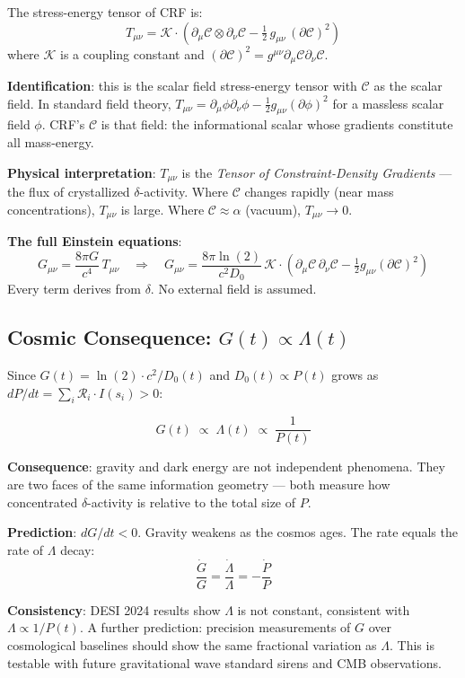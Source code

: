 \documentclass[12pt]{article}
\begin{document}
\begin{derivedbox}
The stress-energy tensor of CRF is:
\[
  T_{\mu\nu} = \mathcal{K} \cdot \left(
    \partial_\mu\mathcal{C} \otimes \partial_\nu\mathcal{C}
    - \tfrac{1}{2}\,g_{\mu\nu}\,(\partial\mathcal{C})^2
  \right)
\]
where $\mathcal{K}$ is a coupling constant and
$(\partial\mathcal{C})^2 = g^{\mu\nu}\partial_\mu\mathcal{C}
\partial_\nu\mathcal{C}$.

\textbf{Identification}: this is the scalar field stress-energy
tensor with $\mathcal{C}$ as the scalar field. In standard
field theory, $T_{\mu\nu} = \partial_\mu\phi\partial_\nu\phi
- \frac{1}{2}g_{\mu\nu}(\partial\phi)^2$ for a massless scalar
field $\phi$. CRF's $\mathcal{C}$ is that field: the
informational scalar whose gradients constitute all
mass-energy.

\textbf{Physical interpretation}: $T_{\mu\nu}$ is the
\textit{Tensor of Constraint-Density Gradients} --- the flux
of crystallized $\delta$-activity. Where $\mathcal{C}$ changes
rapidly (near mass concentrations), $T_{\mu\nu}$ is large.
Where $\mathcal{C} \approx \alpha$ (vacuum), $T_{\mu\nu} \to 0$.

\textbf{The full Einstein equations}:
\[
  G_{\mu\nu} = \frac{8\pi G}{c^4}\,T_{\mu\nu}
  \quad\Rightarrow\quad
  G_{\mu\nu} = \frac{8\pi\ln(2)}{c^2 D_0}\,\mathcal{K}\cdot
  \left(\partial_\mu\mathcal{C}\,\partial_\nu\mathcal{C}
  - \tfrac{1}{2}g_{\mu\nu}(\partial\mathcal{C})^2\right)
\]
Every term derives from $\delta$. No external field is assumed.
\end{derivedbox}

\subsection{Cosmic Consequence: $G(t) \propto \Lambda(t)$}

Since $G(t) = \ln(2)\cdot c^2/D_0(t)$ and
$D_0(t) \propto P(t)$ grows as $dP/dt = \sum_i
\mathcal{R}_i \cdot I(s_i) > 0$:

\begin{derivedbox}
\[
  G(t) \;\propto\; \Lambda(t) \;\propto\; \frac{1}{P(t)}
\]

\textbf{Consequence}: gravity and dark energy are not independent
phenomena. They are two faces of the same information geometry
--- both measure how concentrated $\delta$-activity is relative
to the total size of $P$.

\textbf{Prediction}: $dG/dt < 0$. Gravity weakens as the cosmos
ages. The rate equals the rate of $\Lambda$ decay:
\[
  \frac{\dot{G}}{G} = \frac{\dot{\Lambda}}{\Lambda}
  = -\frac{\dot{P}}{P}
\]

\textbf{Consistency}: DESI 2024 results show $\Lambda$ is not
constant, consistent with $\Lambda \propto 1/P(t)$. A further
prediction: precision measurements of $G$ over cosmological
baselines should show the same fractional variation as $\Lambda$.
This is testable with future gravitational wave standard sirens
and CMB observations.
\end{derivedbox}
\end{document}
